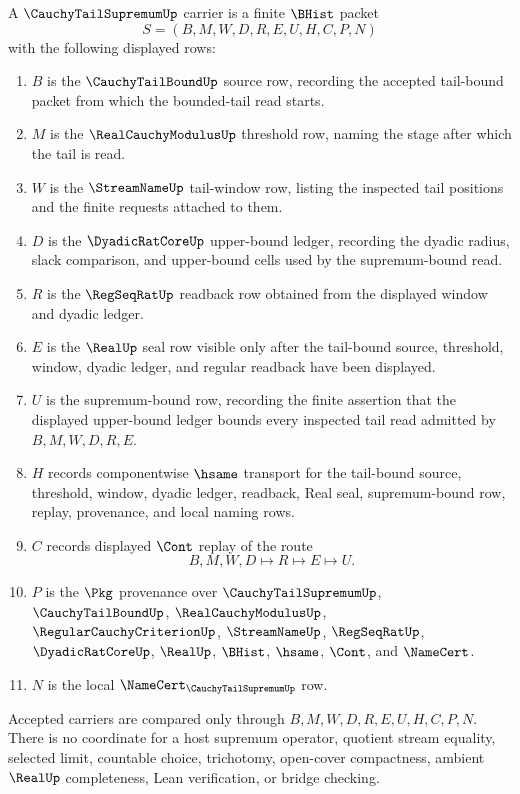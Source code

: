 \begin{definition}
\label{def:cauchy-tail-supremum-carrier}
A $\CauchyTailSupremumUp$ carrier is a finite $\BHist$ packet
$$
S=(B,M,W,D,R,E,U,H,C,P,N)
$$
with the following displayed rows:
\begin{enumerate}
\item $B$ is the $\CauchyTailBoundUp$ source row, recording the accepted tail-bound packet from which the bounded-tail read starts.
\item $M$ is the $\RealCauchyModulusUp$ threshold row, naming the stage after which the tail is read.
\item $W$ is the $\StreamNameUp$ tail-window row, listing the inspected tail positions and the finite requests attached to them.
\item $D$ is the $\DyadicRatCoreUp$ upper-bound ledger, recording the dyadic radius, slack comparison, and upper-bound cells used by the supremum-bound read.
\item $R$ is the $\RegSeqRatUp$ readback row obtained from the displayed window and dyadic ledger.
\item $E$ is the $\RealUp$ seal row visible only after the tail-bound source, threshold, window, dyadic ledger, and regular readback have been displayed.
\item $U$ is the supremum-bound row, recording the finite assertion that the displayed upper-bound ledger bounds every inspected tail read admitted by $B,M,W,D,R,E$.
\item $H$ records componentwise $\hsame$ transport for the tail-bound source, threshold, window, dyadic ledger, readback, Real seal, supremum-bound row, replay, provenance, and local naming rows.
\item $C$ records displayed $\Cont$ replay of the route
$$
B,M,W,D \longmapsto R \longmapsto E \longmapsto U .
$$
\item $P$ is the $\Pkg$ provenance over $\CauchyTailSupremumUp$, $\CauchyTailBoundUp$, $\RealCauchyModulusUp$, $\RegularCauchyCriterionUp$, $\StreamNameUp$, $\RegSeqRatUp$, $\DyadicRatCoreUp$, $\RealUp$, $\BHist$, $\hsame$, $\Cont$, and $\NameCert$.
\item $N$ is the local $\NameCert_{\CauchyTailSupremumUp}$ row.
\end{enumerate}
Accepted carriers are compared only through $B,M,W,D,R,E,U,H,C,P,N$. There is no coordinate for a host supremum operator, quotient stream equality, selected limit, countable choice, trichotomy, open-cover compactness, ambient $\RealUp$ completeness, Lean verification, or bridge checking.
\end{definition}

